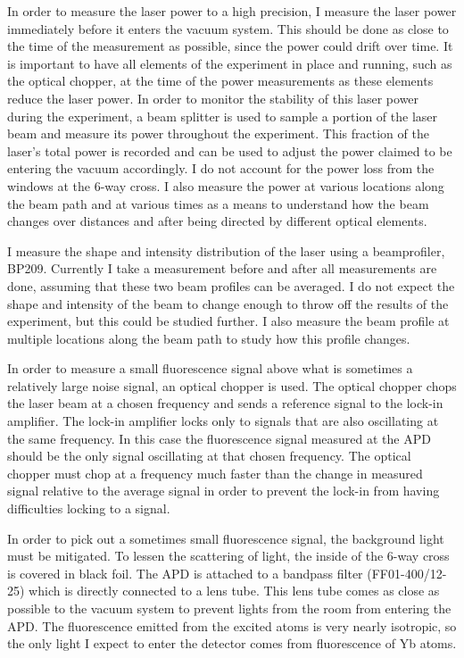 \documentclass[12pt, a4paper]{article}
\begin{document}
In order to measure the laser power to a high precision, I measure the laser power immediately before it enters the vacuum system. This should be done as close to the time of the measurement as possible, since the power could drift over time. It is important to have all elements of the experiment in place and running, such as the optical chopper, at the time of the power measurements as these elements reduce the laser power. In order to monitor the stability of this laser power during the experiment, a beam splitter is used to sample a portion of the laser beam and measure its power throughout the experiment. This fraction of the laser's total power is recorded and can be used to adjust the power claimed to be entering the vacuum accordingly. I do not account for the power loss from the windows at the 6-way cross. I also measure the power at various locations along the beam path and at various times as a means to understand how the beam changes over distances and after being directed by different optical elements.

I measure the shape and intensity distribution of the laser using a beamprofiler, BP209. Currently I take a measurement before and after all measurements are done, assuming that these two beam profiles can be averaged. I do not expect the shape and intensity of the beam to change enough to throw off the results of the experiment, but this could be studied further. I also measure the beam profile at multiple locations along the beam path to study how this profile changes. 

In order to measure a small fluorescence signal above what is sometimes a relatively large noise signal, an optical chopper is used. The optical chopper chops the laser beam at a chosen frequency and sends a reference signal to the lock-in amplifier. The lock-in amplifier locks only to signals that are also oscillating at the same frequency. In this case the fluorescence signal measured at the APD should be the only signal oscillating at that chosen frequency. The optical chopper must chop at a frequency much faster than the change in measured signal relative to the average signal in order to prevent the lock-in from having difficulties locking to a signal.  

In order to pick out a sometimes small fluorescence signal, the background light must be mitigated. To lessen the scattering of light, the inside of the 6-way cross is covered in black foil. The APD is attached to a bandpass filter (FF01-400/12-25) which is directly connected to a lens tube. This lens tube comes as close as possible to the vacuum system to prevent lights from the room from entering the APD. The fluorescence emitted from the excited atoms is very nearly isotropic, so the only light I expect to enter the detector comes from fluorescence of Yb atoms.
\end{document}
